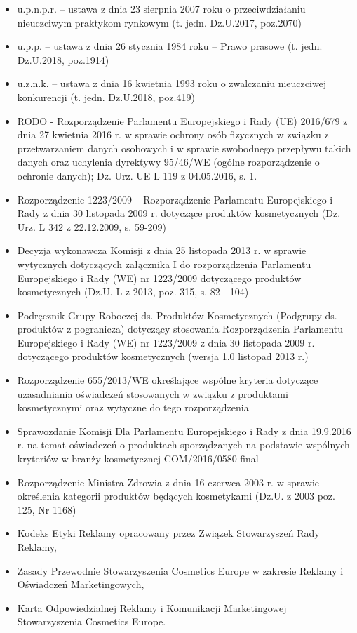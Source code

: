 \begin{itemize}
	\item u.p.n.p.r. – ustawa z dnia 23 sierpnia 2007 roku o przeciwdziałaniu nieuczciwym praktykom rynkowym (t. jedn. Dz.U.2017, poz.2070)
	\item u.p.p. – ustawa z dnia 26 stycznia 1984 roku – Prawo prasowe (t. jedn. Dz.U.2018, poz.1914)
	\item u.z.n.k. – ustawa z dnia 16 kwietnia 1993 roku o zwalczaniu nieuczciwej konkurencji (t. jedn. Dz.U.2018, poz.419)
	\item RODO - Rozporządzenie Parlamentu Europejskiego i Rady (UE) 2016/679 z dnia 27 kwietnia 2016 r. w sprawie ochrony osób fizycznych w związku z przetwarzaniem danych osobowych i w sprawie swobodnego przepływu takich danych oraz uchylenia dyrektywy 95/46/WE (ogólne rozporządzenie o ochronie danych); Dz. Urz. UE L 119 z 04.05.2016, s. 1.
	\item Rozporządzenie 1223/2009 – Rozporządzenie Parlamentu Europejskiego i Rady z dnia 30 listopada 2009 r. dotyczące produktów kosmetycznych (Dz. Urz. L 342 z 22.12.2009, s. 59-209)
	\item Decyzja wykonawcza Komisji z dnia 25 listopada 2013 r. w sprawie wytycznych dotyczących załącznika I do rozporządzenia Parlamentu Europejskiego i Rady (WE) nr 1223/2009 dotyczącego produktów kosmetycznych (Dz.U. L z 2013, poz. 315, s. 82—104)
	\item Podręcznik Grupy Roboczej ds. Produktów Kosmetycznych (Podgrupy ds. produktów z pogranicza) dotyczący stosowania Rozporządzenia Parlamentu Europejskiego i Rady (WE) nr 1223/2009 z dnia 30 listopada 2009 r. dotyczącego produktów kosmetycznych (wersja 1.0 listopad 2013 r.)
	\item Rozporządzenie 655/2013/WE określające wspólne kryteria dotyczące uzasadniania oświadczeń stosowanych w związku z produktami kosmetycznymi oraz wytyczne do tego rozporządzenia
	\item Sprawozdanie Komisji Dla Parlamentu Europejskiego i Rady z dnia 19.9.2016 r. na temat oświadczeń o produktach sporządzanych na podstawie wspólnych kryteriów w branży kosmetycznej COM/2016/0580 final
	\item Rozporządzenie Ministra Zdrowia z dnia 16 czerwca 2003 r. w sprawie określenia kategorii produktów będących kosmetykami (Dz.U. z 2003 poz. 125, Nr 1168)
	\item Kodeks Etyki Reklamy opracowany przez Związek Stowarzyszeń Rady Reklamy,
	\item Zasady Przewodnie Stowarzyszenia Cosmetics Europe w zakresie Reklamy i Oświadczeń Marketingowych,
	\item Karta Odpowiedzialnej Reklamy i Komunikacji Marketingowej Stowarzyszenia Cosmetics Europe.
\end{itemize}

